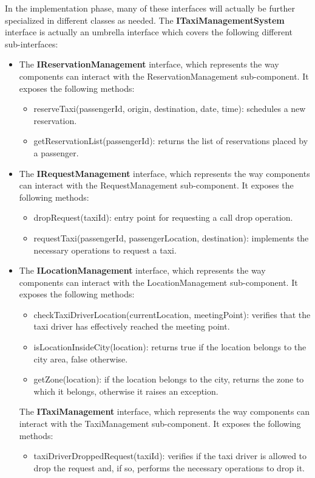 In the implementation phase, many of these interfaces will actually be further specialized in different classes as needed.
The \textbf{ITaxiManagementSystem} interface is actually an umbrella interface which covers the following different sub-interfaces: 
	\begin{itemize}
	\item The \textbf{IReservationManagement} interface, which represents the way components can interact with the ReservationManagement sub-component. It exposes the following methods:
	\begin{itemize}
	\item reserveTaxi(passengerId, origin, destination, date, time): schedules a new reservation.
	\item getReservationList(passengerId): returns the list of reservations placed by a passenger.
	\end{itemize}
	\item The \textbf{IRequestManagement} interface, which represents the way components can interact with the RequestManagement sub-component. It exposes the following methods:
	\begin{itemize}
	\item dropRequest(taxiId): entry point for requesting a call drop operation.
	\item requestTaxi(passengerId, passengerLocation, destination): implements the necessary operations to request a taxi.
	\end{itemize}
	\item The \textbf{ILocationManagement} interface, which represents the way components can interact with the LocationManagement sub-component. It exposes the following methods:
	\begin{itemize}
	\item checkTaxiDriverLocation(currentLocation, meetingPoint): verifies that the taxi driver has effectively reached the meeting point.
	\item isLocationInsideCity(location): returns true if the location belongs to the city area, false otherwise.
	\item getZone(location): if the location belongs to the city, returns the zone to which it belongs, otherwise it raises an exception.
	\end{itemize}
	The \textbf{ITaxiManagement} interface, which represents the way components can interact with the TaxiManagement sub-component. It exposes the following methods:
	\begin{itemize}
	\item taxiDriverDroppedRequest(taxiId): verifies if the taxi driver is allowed to drop the request and, if so, performs the necessary operations to drop it.

\end{itemize}
\end{itemize}
